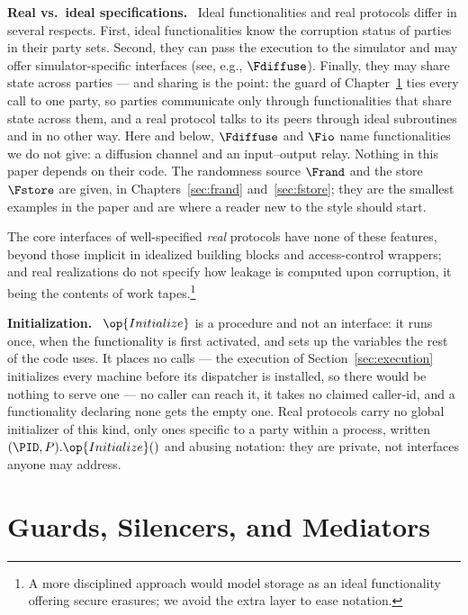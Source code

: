 \documentclass[10pt,oneside,openany]{book}
\newcommand{\heading}[1]{\medskip\par\noindent\textcolor{accent}{\textbf{#1.}}\ }
\theoremstyle{accentdef}
\theoremstyle{accentplain}
\begin{document}
\heading{Real vs.\ ideal specifications} Ideal functionalities and real protocols differ in
several respects. First, ideal functionalities know the corruption status of parties in their
party sets. Second, they can pass the execution to the simulator and may offer
simulator-specific interfaces (see, e.g., $\Fdiffuse$). Finally, they may share state across
parties --- and sharing is the point: the guard of Chapter~\ref{sec:wrappers} ties every call to
one party, so parties communicate only through functionalities that share state across them, and
a real protocol talks to its peers through ideal subroutines and in no other way. Here and below,
$\Fdiffuse$ and $\Fio$ name functionalities we do not give: a diffusion channel and an
input--output relay. Nothing in this paper depends on their code. The randomness source $\Frand$
and the store $\Fstore$ are given, in Chapters~\ref{sec:frand} and~\ref{sec:fstore}; they are
the smallest examples in the paper and are where a reader new to the style should start.

The core interfaces of well-specified \emph{real} protocols have none of these features, beyond
those implicit in idealized building blocks and access-control wrappers; and real realizations do
not specify how leakage is computed upon corruption, it being the contents of work
tapes.\footnote{A more disciplined approach would model storage as an ideal functionality offering
secure erasures; we avoid the extra layer to ease notation.}

\heading{Initialization} $\op{Initialize}$ is a procedure and not an interface: it runs once, when
the functionality is first activated, and sets up the variables the rest of the code uses. It
places no calls --- the execution of Section~\ref{sec:execution} initializes every machine before
its dispatcher is installed, so there would be nothing to serve one --- no caller can reach it, it
takes no claimed caller-id, and a functionality declaring none gets the empty one. Real protocols
carry no global initializer of this kind, only ones specific to a party within a process, written
$(\PID,P).\op{Initialize}()$ and abusing notation: they are private, not interfaces anyone may
address.

\chapter{Guards, Silencers, and Mediators}\label{sec:wrappers}
\end{document}
